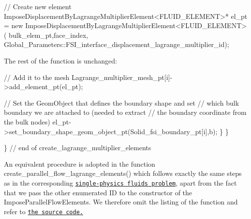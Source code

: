 \begin{DoxyCodeInclude}
     
     \textcolor{comment}{// Create new element}
     ImposeDisplacementByLagrangeMultiplierElement<FLUID\_ELEMENT>* el\_pt =
      \textcolor{keyword}{new}  ImposeDisplacementByLagrangeMultiplierElement<FLUID\_ELEMENT>(
       bulk\_elem\_pt,face\_index, 
       Global\_Parameters::FSI\_interface\_displacement\_lagrange\_multiplier\_id);   

\end{DoxyCodeInclude}


The rest of the function is unchanged\+:


\begin{DoxyCodeInclude}
     
     \textcolor{comment}{// Add it to the mesh}
     Lagrange\_multiplier\_mesh\_pt[i]->add\_element\_pt(el\_pt);
     
     \textcolor{comment}{// Set the GeomObject that defines the boundary shape and set}
     \textcolor{comment}{// which bulk boundary we are attached to (needed to extract}
     \textcolor{comment}{// the boundary coordinate from the bulk nodes)}
     el\_pt->set\_boundary\_shape\_geom\_object\_pt(Solid\_fsi\_boundary\_pt[i],b);
    \}
  \}

\} \textcolor{comment}{// end of create\_lagrange\_multiplier\_elements}

\end{DoxyCodeInclude}


An equivalent procedure is adopted in the function {\ttfamily create\+\_\+parallel\+\_\+flow\+\_\+lagrange\+\_\+elements()} which follows exactly the same steps as in the corresponding \href{../../../navier_stokes/vmtk_fluid/html/index.html#parallel_flow}{\tt single-\/physics fluids problem}, apart from the fact that we pass the other enumerated ID to the constructor of the {\ttfamily Impose\+Parallel\+Flow\+Elements}. We therefore omit the listing of the function and refer to \href{../../../../demo_drivers/interaction/vmtk_fsi/vmtk_fsi.cc}{\tt the source code.}



 


